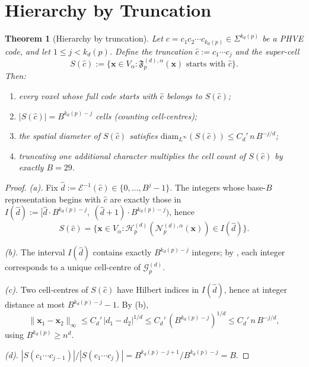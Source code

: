 \documentclass[11pt,a4paper]{article}
\theoremstyle{plain}
\newtheorem{theorem}{Theorem}[section]
\theoremstyle{definition}
\theoremstyle{remark}
\newcommand{\Hil}{\mathcal{H}}
\newcommand{\Enc}{\mathcal{E}}
\newcommand{\Nor}{\mathcal{N}}
\newcommand{\Fc}{\mathfrak{F}}
\newcommand{\Grid}{\mathcal{G}}
\begin{document}
\section{Hierarchy by Truncation}\label{sec:truncation}

\begin{theorem}[Hierarchy by truncation]\label{thm:truncation}
Let $c = c_1 c_2 \cdots c_{k_d(p)}\in\Sigma^{k_d(p)}$ be a PHVE code, and
let $1\leq j < k_d(p)$. Define the truncation $\hat c := c_1\cdots c_j$
and the \emph{super-cell}
\[
S(\hat c) := \bigl\{\mathbf{x}\in V_\alpha :
\Fc_p^{(d),\alpha}(\mathbf{x})\text{ starts with }\hat c\bigr\}.
\]
Then:
\begin{enumerate}[label=(\alph*),nosep]
\item every voxel whose full code starts with $\hat c$ belongs to $S(\hat c)$;
\item $|S(\hat c)| = B^{k_d(p)-j}$ cells (counting cell-centres);
\item the spatial diameter of $S(\hat c)$ satisfies
$\mathrm{diam}_{L^\infty}(S(\hat c)) \leq C_d'\, n\, B^{-j/d}$;
\item truncating one additional character multiplies the cell count of
$S(\hat c)$ by exactly $B = 29$.
\end{enumerate}
\end{theorem}

\begin{proof}
\emph{(a).} Fix $\hat d := \Enc^{-1}(\hat c)\in\{0,\dots,B^j-1\}$. The
integers whose base-$B$ representation begins with $\hat c$ are exactly
those in
$I(\hat d) := [\hat d\cdot B^{k_d(p)-j},\ (\hat d+1)\cdot B^{k_d(p)-j})$,
hence
\[
S(\hat c) = \bigl\{ \mathbf{x}\in V_\alpha :
\Hil_p^{(d)}(\Nor_p^{(d),\alpha}(\mathbf{x}))\in I(\hat d)\bigr\}.
\]

\emph{(b).} The interval $I(\hat d)$ contains exactly $B^{k_d(p)-j}$
integers; by , each integer corresponds to a
unique cell-centre of $\Grid_p^{(d)}$.

\emph{(c).} Two cell-centres of $S(\hat c)$ have Hilbert indices in
$I(\hat d)$, hence at integer distance at most $B^{k_d(p)-j}-1$. By
(b),
\[
\|\mathbf{x}_1-\mathbf{x}_2\|_\infty
\leq C_d'\,|d_1-d_2|^{1/d}
\leq C_d'\,(B^{k_d(p)-j})^{1/d}
\leq C_d'\,n\,B^{-j/d},
\]
using $B^{k_d(p)}\geq n^d$.

\emph{(d).} $|S(c_1\cdots c_{j-1})|/|S(c_1\cdots c_j)|
= B^{k_d(p)-j+1}/B^{k_d(p)-j} = B$.
\end{proof}
\end{document}
